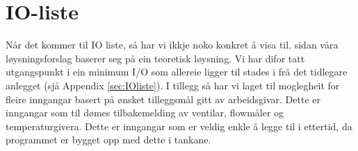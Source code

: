 \section{IO-liste}
\thispagestyle{fancy}

Når det kommer til \gls{IO} liste, så har vi ikkje noko konkret å visa til, sidan våra løysningsforslag baserer seg på ein teoretisk løysning. 
Vi har difor tatt utgangspunkt i ein minimum I/O som allereie ligger til stades i frå det tidlegare anlegget (sjå Appendix \ref{sec:IOliste}). 
I tillegg så har vi laget til moglegheit for fleire inngangar basert på ønsket tilleggsmål gitt av arbeidsgivar. 
Dette er inngangar som til dømes tilbakemelding av ventilar, flowmåler og temperaturgivera.
Dette er inngangar som er veldig enkle å legge til i ettertid, da programmet er bygget opp med dette i tankane.